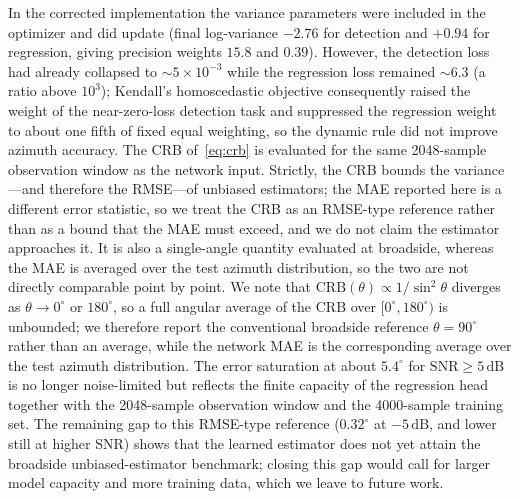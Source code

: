 \documentclass[sensors,article,submit,pdftex,moreauthors]{Definitions/mdpi}
\begin{document}
In the corrected implementation the variance parameters were included in the optimizer and did update (final log-variance $-2.76$ for detection and $+0.94$ for regression, giving precision weights $15.8$ and $0.39$). However, the detection loss had already collapsed to $\sim5\times10^{-3}$ while the regression loss remained $\sim6.3$ (a ratio above $10^3$); Kendall's homoscedastic objective consequently raised the weight of the near-zero-loss detection task and suppressed the regression weight to about one fifth of fixed equal weighting, so the dynamic rule did not improve azimuth accuracy. The CRB of~\eqref{eq:crb} is evaluated for the same 2048-sample observation window as the network input. Strictly, the CRB bounds the variance---and therefore the RMSE---of unbiased estimators; the MAE reported here is a different error statistic, so we treat the CRB as an RMSE-type reference rather than as a bound that the MAE must exceed, and we do not claim the estimator approaches it. It is also a single-angle quantity evaluated at broadside, whereas the MAE is averaged over the test azimuth distribution, so the two are not directly comparable point by point. We note that $\mathrm{CRB}(\theta)\propto1/\sin^2\theta$ diverges as $\theta\to0^\circ$ or $180^\circ$, so a full angular average of the CRB over $[0^\circ,180^\circ)$ is unbounded; we therefore report the conventional broadside reference $\theta=90^\circ$ rather than an average, while the network MAE is the corresponding average over the test azimuth distribution. The error saturation at about $5.4^\circ$ for $\mathrm{SNR}\ge5\,\mathrm{dB}$ is no longer noise-limited but reflects the finite capacity of the regression head together with the 2048-sample observation window and the 4000-sample training set. The remaining gap to this RMSE-type reference ($0.32^\circ$ at $-5\,\mathrm{dB}$, and lower still at higher SNR) shows that the learned estimator does not yet attain the broadside unbiased-estimator benchmark; closing this gap would call for larger model capacity and more training data, which we leave to future work.
\end{document}

